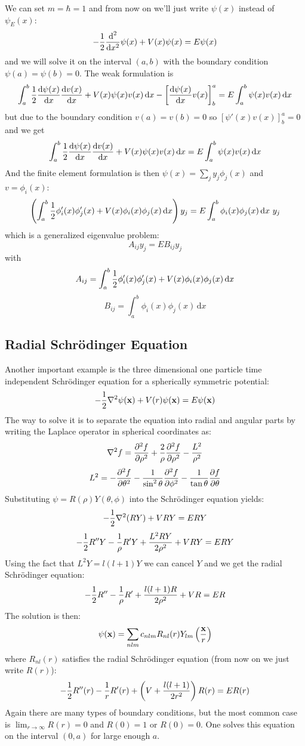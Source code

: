 \documentclass[12pt]{article}
\def\d{\mbox{d}}
\begin{document}
We can set $m=\hbar=1$ and from now on we'll just write $\psi(x)$ instead of
$\psi_E(x)$:
$$
-{1\over2}{\d^2\over\d x^2}\psi(x)+V(x)\psi(x)=E\psi(x)
$$
and we will solve it on the interval $(a, b)$ with the boundary condition
$\psi(a)=\psi(b)=0$. The weak formulation is
$$
\int_a^b{1\over2}{\d\psi(x)\over\d x}{\d v(x)\over\d x}+V(x)\psi(x)v(x)\,\d x
-\left[{\d\psi(x)\over\d x}v(x)\right]^a_b
=E\int_a^b\psi(x)v(x)\,\d x
$$
but due to the boundary condition $v(a)=v(b)=0$ so
$\left[\psi'(x)v(x)\right]^a_b=0$ and we get
$$
\int_a^b{1\over2}{\d\psi(x)\over\d x}{\d v(x)\over\d x}+V(x)\psi(x)v(x)\,\d x
=E\int_a^b\psi(x)v(x)\,\d x
$$
And the finite element formulation is then $\psi(x)=\sum_j y_j\phi_j(x)$ and
$v=\phi_i(x)$:
$$
\left(\int_a^b{1\over2}\phi_i'(x)\phi_j'(x)+V(x)\phi_i(x)\phi_j(x)\,\d x\right)
y_j
=E\int_a^b\phi_i(x)\phi_j(x)\,\d x\ y_j
$$
which is a generalized eigenvalue problem:
$$
A_{ij}y_j=EB_{ij}y_j
$$
with
$$
A_{ij}=\int_a^b{1\over2}\phi_i'(x)\phi_j'(x)+V(x)\phi_i(x)\phi_j(x)\,\d x
$$
$$
B_{ij}=\int_a^b\phi_i(x)\phi_j(x)\,\d x
$$


\subsection{Radial Schr\"odinger Equation}

Another important example is the three dimensional one particle time
independent Schr\"odinger equation for a spherically symmetric potential:
$$
-{1\over2}\nabla^2\psi({\bf x})+V(r)\psi({\bf x})=E\psi({\bf x})
$$
The way to solve it is to separate the equation into radial and angular parts
by writing the Laplace operator in spherical coordinates as:
$$
\nabla^2f = 
{\partial^2 f\over\partial\rho^2}
+{2\over \rho}{\partial^2 f\over\partial\rho^2}
-{L^2\over \rho^2}
$$
$$
L^2=
-{\partial^2 f\over\partial\theta^2}
-{1\over\sin^2\theta}{\partial^2 f\over\partial\phi^2}
-{1\over\tan\theta}{\partial f\over\partial\theta}
$$
Substituting $\psi=R(\rho)Y(\theta,\phi)$ into the Schr\"odinger equation
yields:
$$-{1\over2}\nabla^2(RY)+VRY=ERY$$
$$-{1\over2}R''Y-{1\over\rho}R'Y+{L^2RY\over2\rho^2}+VRY=ERY$$
Using the fact that $L^2Y=l(l+1)Y$ we can cancel $Y$ and we get the radial
Schr\"odinger equation:
$$-{1\over2}R''-{1\over\rho}R'+{l(l+1)R\over2\rho^2}+VR=ER$$
The solution is then:
$$\psi({\bf x})=\sum_{nlm}c_{nlm}R_{nl}(r)Y_{lm}\left({\bf x}\over r\right)$$
where $R_{nl}(r)$ satisfies the radial Schr\"odinger equation (from now on we
just write $R(r)$):
$$-{1\over2}R''(r)-{1\over r}R'(r)+\left(V+{l(l+1)\over2r^2}\right)R(r)=ER(r)$$
Again there are many types of boundary conditions, but the most common case is
$\lim_{r\to\infty}R(r)=0$ and $R(0)=1$ or $R(0)=0$. One solves this equation on
the interval $(0, a)$ for large enough $a$.
\end{document}

